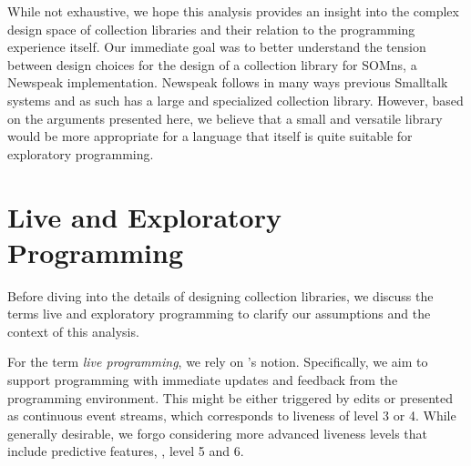 \documentclass[sigconf, authorversion]{acmart}
\def\SOMns{SOM{\sc ns}\xspace}
\begin{document}
%
%
While not exhaustive, we hope this analysis provides an insight
into the complex design space of collection libraries
and their relation to the programming experience itself.
Our immediate goal was to better understand the tension between design choices
for the design of a collection library for \SOMns, a Newspeak implementation\citep{Bracha:10:NS,OptCELWithTruffle}.
Newspeak follows in many ways previous Smalltalk systems
and as such has a large and specialized collection library.
However, based on the arguments presented here,
we believe that a small and versatile library would be more appropriate
for a language that itself is quite suitable for exploratory programming.


\section{Live and Exploratory Programming}
\label{sec:exploratory}

Before diving into the details of designing collection libraries,
we discuss the terms live and exploratory programming
to clarify our assumptions and the context of this analysis.


For the term \emph{live programming}, we rely on \citeauthor{Tanimoto:1990:Viva}'s notion.
Specifically, we aim to support programming
with immediate updates and feedback from the programming environment.
This might be either triggered by edits or presented as continuous event streams,
which corresponds to liveness of level 3 or 4\citep{Tanimoto:1990:Viva}.
While generally desirable, we forgo considering more advanced liveness levels
that include predictive features, \ie, level 5 and 6\citep{Tanimoto:2013:PEL}.
\end{document}

